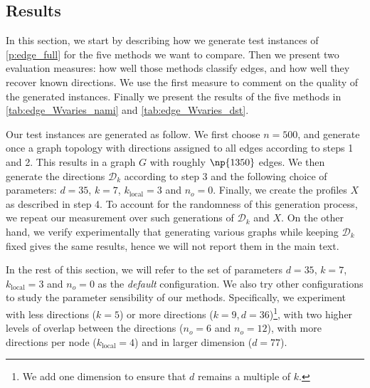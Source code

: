 \subsection{Results}
\label{sub:edge_synth_results}

In this section, we start by describing how we generate test instances of \autoref{p:edge_full} for
the five methods we want to compare.  Then we present two evaluation measures: how well those
methods classify edges, and how well they recover known directions. We use the first measure to
comment on the quality of the generated instances. Finally we present the results of the five
methods in \autoref{tab:edge_Wvaries_nami} and \autoref{tab:edge_Wvaries_dst}.

Our test instances are generated as follow. We first choose $n=500$, and generate once a graph
topology with directions assigned to all edges according to steps 1 and 2. This results in a graph
$G$ with roughly $\np{1350}$ edges. We then generate the directions $\mathcal{D}_k$ according to
step 3 and the following choice of parameters: $d=35$, $k=7$, $k_{\mathrm{local}}=3$ and $n_o=0$.
Finally, we create the profiles $X$ as described in step 4.
To account for the randomness of this generation process, we repeat our
measurement over  such generations of $\mathcal{D}_k$ and $X$. On the other hand, we verify experimentally that
generating various graphs while keeping $\mathcal{D}_k$ fixed gives the same results, hence we will
not report them in the main text.

In the rest of this section, we will refer to the set of parameters $d=35$, $k=7$,
$k_{\mathrm{local}}=3$ and $n_o=0$ as the \emph{default} configuration.
We also try other configurations to study the parameter sensibility of our methods. Specifically, we
experiment with less directions ($k=5$) or more directions ($k=9, d=36$)\footnote{We add one
dimension to ensure that $d$ remains a multiple of $k$.}, with two higher levels of overlap between
the directions ($n_o=6$ and $n_o=12$), with more directions per node ($k_{\mathrm{local}}=4$) and in
larger dimension ($d=77$).

\medskip

